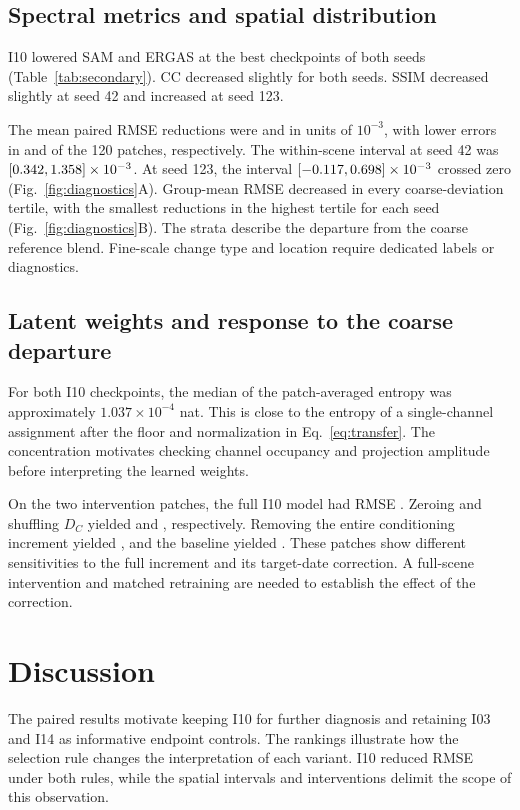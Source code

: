 \documentclass[a4paper,10pt,twocolumn]{article}
\begin{document}
\subsection{Spectral metrics and spatial distribution}
I10 lowered SAM and ERGAS at the best checkpoints of both seeds (Table~\ref{tab:secondary}). CC decreased slightly for both seeds. SSIM decreased slightly at seed 42 and increased at seed 123.

The mean paired RMSE reductions were \MeanPairA{} and \MeanPairB{} in units of $10^{-3}$, with lower errors in \BetterPatchesA{} and \BetterPatchesB{} of the 120 patches, respectively. The within-scene interval at seed 42 was $[0.342,1.358]\times10^{-3}$. At seed 123, the interval $[-0.117,0.698]\times10^{-3}$ crossed zero (Fig.~\ref{fig:diagnostics}A). Group-mean RMSE decreased in every coarse-deviation tertile, with the smallest reductions in the highest tertile for each seed (Fig.~\ref{fig:diagnostics}B). The strata describe the departure from the coarse reference blend. Fine-scale change type and location require dedicated labels or diagnostics.

\subsection{Latent weights and response to the coarse departure}
For both I10 checkpoints, the median of the patch-averaged entropy was approximately $1.037\times10^{-4}$ nat. This is close to the entropy of a single-channel assignment after the floor and normalization in Eq.~\eqref{eq:transfer}. The concentration motivates checking channel occupancy and projection amplitude before interpreting the learned weights.

On the two intervention patches, the full I10 model had RMSE \ProbeFull{}. Zeroing and shuffling $D_C$ yielded \ProbeZero{} and \ProbeShuffle{}, respectively. Removing the entire conditioning increment yielded \ProbeNoInjection{}, and the baseline yielded \ProbeBase{}. These patches show different sensitivities to the full increment and its target-date correction. A full-scene intervention and matched retraining are needed to establish the effect of the correction.

\section{Discussion}
The paired results motivate keeping I10 for further diagnosis and retaining I03 and I14 as informative endpoint controls. The rankings illustrate how the selection rule changes the interpretation of each variant. I10 reduced RMSE under both rules, while the spatial intervals and interventions delimit the scope of this observation.
\end{document}
